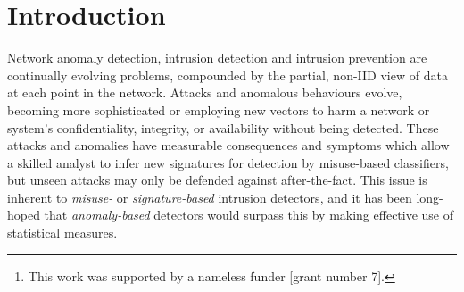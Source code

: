 \documentclass[conference, letterpaper, 10pt, times]{IEEEtran}
\title{\mytitle{}}
\author{
Anonymous Giraffe\thanks{This work was supported by a nameless funder [grant number 7].},
Anonymous Badger\\
Unnamed Department, Nowhere\\
\email{giraffe.a@unnamed.com}
}
\date{}
\begin{document}

\maketitle

\begin{abstract}
Network intrusion detection and prevention systems backed by machine learning (and the autonomous operation they promise) have been long-heralded, but face problems hampering effective deployment.
The detection problem in this domain is fraught with difficulty; it is an evolving, non-stationary problem as usage patterns shift, new protocols and applications are introduced, and is compounded by burstiness and seasonal variation.

\emph{Reinforcement learning} (RL) may overcome the detection problem for certain classes of anomaly by managing and monitoring \emph{consequences}; an agent's role is to learn to optimise performance criteria (which are always available).

We present...
?? Contribs

?? Taking up space to figure out how much room I have for an intro

?? still taking up space...

?? still going...

?? done...
\end{abstract}

\section{Introduction}

Network anomaly detection, intrusion detection and intrusion prevention are continually evolving problems, compounded by the partial, non-IID view of data at each point in the network.
Attacks and anomalous behaviours evolve, becoming more sophisticated or employing new vectors to harm a network or system's confidentiality, integrity, or availability without being detected.
These attacks and anomalies have measurable consequences and symptoms which allow a skilled analyst to infer new signatures for detection by misuse-based classifiers, but unseen attacks may only be defended against after-the-fact.
This issue is inherent to \emph{misuse-} or \emph{signature-based} intrusion detectors, and it has been long-hoped that \emph{anomaly-based} detectors would surpass this by making effective use of statistical measures.
\end{document}
